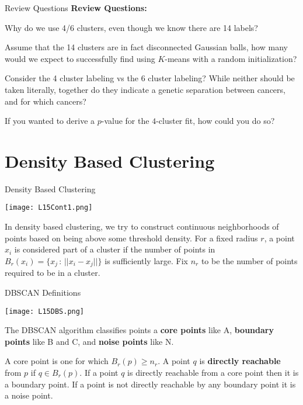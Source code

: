 \documentclass[10pt, table, dvipsnames,xcdraw,handout]{beamer}
\begin{document}
\begin{frame}[fragile]{Review Questions}
\textbf{Review Questions:}

Why do we use 4/6 clusters, even though we know there are 14 labels?

Assume that the 14 clusters are in fact disconnected Gaussian balls, how many would we expect to successfully find using $K$-means with a random initialization?

Consider the 4 cluster labeling vs the 6 cluster labeling? While neither should be taken literally, together do they indicate a genetic separation between cancers, and for which cancers?

If you wanted to derive a $p$-value for the $4$-cluster fit, how could you do so?
\end{frame}








\section{Density Based Clustering}


\begin{frame}[fragile]{Density Based Clustering}
  \begin{minipage}[t][0.5\textheight][t]{\textwidth}
	\centering \texttt{[image: L15Cont1.png]} 
  \end{minipage}
  \vfill
\begin{minipage}[t][0.5\textheight][t]{\textwidth}
In density based clustering, we try to construct continuous neighborhoods of points based on being above some threshold density. \pause For a fixed radius $r$, a point $x_i$ is considered part of a cluster if the number of points in $B_{r}(x_i) = \{x_j \,:\, ||x_i - x_j||\}$ is sufficiently large. \pause Fix $n_r$ to be the number of points required to be in a cluster. 
\end{minipage}
\end{frame}



\begin{frame}[fragile]{DBSCAN Definitions}
  \begin{minipage}[t][0.5\textheight][t]{\textwidth}
	\centering \texttt{[image: L15DBS.png]} 
  \end{minipage}
  \vfill
\begin{minipage}[t][0.5\textheight][t]{\textwidth}
The DBSCAN algorithm classifies points a \textbf{core points} like A, \textbf{boundary points} like B and C, and \textbf{noise points} like N. \pause \newline

A core point is one for which $B_r(p)\geq n_r$. A point $q$ is \textbf{directly reachable} from $p$ if $q\in B_r(p)$. \pause If a point $q$ is directly reachable from a core point then it is a boundary point. \pause If a point is not directly reachable by any boundary point it is a noise point.
\end{minipage}
\end{frame}
\end{document}
